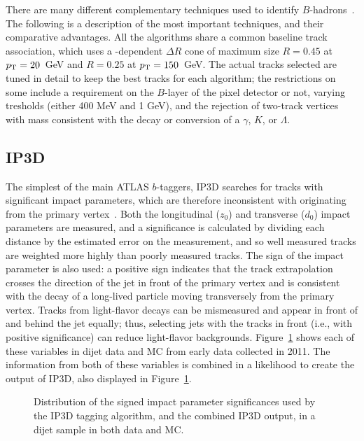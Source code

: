 There are many different complementary techniques used to identify $B$-hadrons~\cite{ATLAS-B}. The following is a description of the most important techniques, and their comparative advantages. All the algorithms share a common baseline track association, which uses a \pt-dependent $\Delta R$ cone of maximum size $R=0.45$ at $p_{\text{T}} = 20$~GeV and $R=0.25$ at $p_{\text{T}} = 150$~GeV. The actual tracks selected are tuned in detail to keep the best tracks for each algorithm; the restrictions on some include a requirement on the $B$-layer of the pixel detector or not, varying \pt tresholds (either 400 MeV and 1 GeV), and the rejection of two-track vertices with mass consistent with the decay or conversion of a $\gamma$, $K$, or $\Lambda$.

\subsection{IP3D}

The simplest of the main ATLAS $b$-taggers, IP3D searches for tracks with significant impact parameters, which are therefore inconsistent with originating from the primary vertex~\cite{ATLAS-B}. Both the longitudinal ($z_0$) and transverse ($d_0$) impact parameters are measured, and a significance is calculated by dividing each distance by the estimated error on the measurement, and so well measured tracks are weighted more highly than poorly measured tracks. The sign of the impact parameter is also used: a positive sign indicates that the track extrapolation crosses the direction of the jet in front of the primary vertex and is consistent with the decay of a long-lived particle moving transversely from the primary vertex. Tracks from light-flavor decays can be mismeasured and appear in front of and behind the jet equally; thus, selecting jets with the tracks in front (i.e., with positive significance) can reduce light-flavor backgrounds. Figure~\ref{fig:jet-reconstruction:b-tagging:ip3d} shows each of these variables in dijet data and MC from early data collected in 2011. The information from both of these variables is combined in a likelihood to create the output of IP3D, also displayed in Figure~\ref{fig:jet-reconstruction:b-tagging:ip3d}.


\begin{figure}
\centering
{}
\label{fig:jet-reconstruction:b-tagging:ip3d}
\caption{Distribution of the signed impact parameter significances used by the IP3D tagging algorithm, and the combined IP3D output, in a dijet sample in both data and MC.}
\end{figure}

